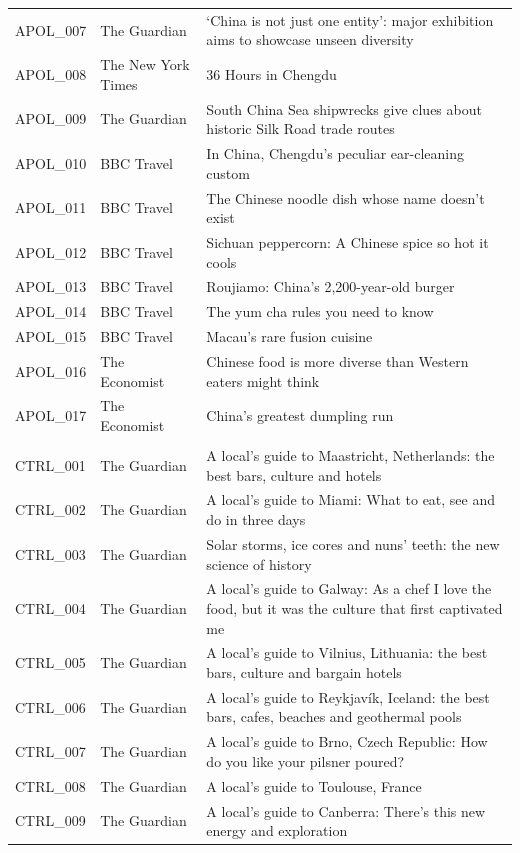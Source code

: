 \begin{longtable}{@{}p{1.5cm}p{2.6cm}p{9.8cm}@{}}
APOL\_007 & The Guardian & ‘China is not just one entity’: major exhibition aims to showcase unseen diversity \\
APOL\_008 & The New York Times & 36 Hours in Chengdu \\
APOL\_009 & The Guardian & South China Sea shipwrecks give clues about historic Silk Road trade routes \\
APOL\_010 & BBC Travel & In China, Chengdu's peculiar ear-cleaning custom \\
APOL\_011 & BBC Travel & The Chinese noodle dish whose name doesn't exist \\
APOL\_012 & BBC Travel & Sichuan peppercorn: A Chinese spice so hot it cools \\
APOL\_013 & BBC Travel & Roujiamo: China's 2,200-year-old burger \\
APOL\_014 & BBC Travel & The yum cha rules you need to know \\
APOL\_015 & BBC Travel & Macau's rare fusion cuisine \\
APOL\_016 & The Economist & Chinese food is more diverse than Western eaters might think \\
APOL\_017 & The Economist & China’s greatest dumpling run \\
\addlinespace
\multicolumn{3}{l}{\textit{Non-China control}}\\
CTRL\_001 & The Guardian & A local’s guide to Maastricht, Netherlands: the best bars, culture and hotels \\
CTRL\_002 & The Guardian & A local’s guide to Miami: What to eat, see and do in three days \\
CTRL\_003 & The Guardian & Solar storms, ice cores and nuns’ teeth: the new science of history \\
CTRL\_004 & The Guardian & A local’s guide to Galway: As a chef I love the food, but it was the culture that first captivated me \\
CTRL\_005 & The Guardian & A local’s guide to Vilnius, Lithuania: the best bars, culture and bargain hotels \\
CTRL\_006 & The Guardian & A local’s guide to Reykjavík, Iceland: the best bars, cafes, beaches and geothermal pools \\
CTRL\_007 & The Guardian & A local’s guide to Brno, Czech Republic: How do you like your pilsner poured? \\
CTRL\_008 & The Guardian & A local’s guide to Toulouse, France \\
CTRL\_009 & The Guardian & A local’s guide to Canberra: There’s this new energy and exploration \\

\end{longtable}
